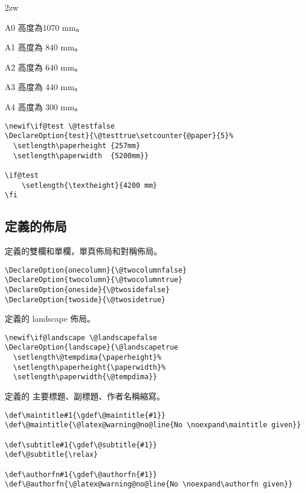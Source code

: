 \par{}
\begin{biao}[高度]\leftskip 2zw
\item[A0] 高度為1070 mm。
\item[A1] 高度為 840 mm。
\item[A2] 高度為 640 mm。
\item[A3]	高度為 440 mm。
\item[A4] 高度為 300 mm。
\end{biao}

\begin{lstlisting}[firstnumber=36]
\newif\if@test \@testfalse
\DeclareOption{test}{\@testtrue\setcounter{@paper}{5}%
  \setlength\paperheight {257mm}
  \setlength\paperwidth  {5200mm}}

\if@test
	\setlength{\textheight}{4200 mm}
\fi
\end{lstlisting}

\subsection{定義的佈局}

\par 定義的雙欄和單欄，單頁佈局和對稱佈局。
\begin{lstlisting}[firstnumber=45]
\DeclareOption{onecolumn}{\@twocolumnfalse}
\DeclareOption{twocolumn}{\@twocolumntrue}
\DeclareOption{oneside}{\@twosidefalse}
\DeclareOption{twoside}{\@twosidetrue}
\end{lstlisting}

\par 定義的 landscape 佈局。
\begin{lstlisting}[firstnumber=51]
\newif\if@landscape \@landscapefalse
\DeclareOption{landscape}{\@landscapetrue
  \setlength\@tempdima{\paperheight}%
  \setlength\paperheight{\paperwidth}%
  \setlength\paperwidth{\@tempdima}}
\end{lstlisting}


\par 定義的 主要標題、副標題、作者名稱縮寫。
\begin{lstlisting}[firstnumber=58]
\def\maintitle#1{\gdef\@maintitle{#1}}
\def\@maintitle{\@latex@warning@no@line{No \noexpand\maintitle given}}

\def\subtitle#1{\gdef\@subtitle{#1}}
\def\@subtitle{\relax}

\def\authorfn#1{\gdef\@authorfn{#1}}
\def\@authorfn{\@latex@warning@no@line{No \noexpand\authorfn given}}
\end{lstlisting}

